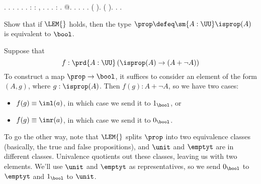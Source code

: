 \begin{coqdoccode}
 .  .  .\coqdoceol
\coqdocindent{1.00em}
 .  .\coqdoceol
\coqdocnoindent
{}.\coqdoceol
\coqdocemptyline
\coqdocnoindent
{}  : \coqdockw{\ensuremath{\forall}}   :  ,  \coqdocnotation{=} .\coqdoceol
\coqdocindent{1.00em}
 .\coqdoceol
\coqdocnoindent
{}.\coqdoceol
\coqdocemptyline
\coqdocnoindent
{}  : \coqdocnotation{(} \coqdocnotation{)} \coqdocnotation{\ensuremath{\eqvsym}} .\coqdoceol
\coqdocindent{1.00em}
 @.\coqdoceol
\coqdocindent{1.00em}
 .  .\coqdoceol
\coqdocindent{1.00em}
 .  .\coqdoceol
\coqdocindent{1.00em}
 (  ).\coqdoceol
\coqdocindent{1.00em}
 (  ).\coqdoceol
\coqdocnoindent
{}.\coqdoceol
\coqdocemptyline
\coqdocemptyline
\coqdocnoindent
{} .\coqdoceol
\coqdocemptyline
\end{coqdoccode}
Show that if $\LEM{}$ holds, then the type $\prop \defeq \sm{A:\UU}\isprop(A)$
is equivalent to $\bool$.


 \soln
Suppose that 
\[
  f : \prd{A:\UU}\left(\isprop(A) \to (A + \lnot A)\right)
\]
To construct a map $\prop \to \bool$, it suffices to consider an element of the
form $(A, g)$, where $g : \isprop(A)$.  Then $f(g) : A + \lnot A$, so we have
two cases:



\begin{itemize}
\item  $f(g) \equiv \inl(a)$, in which case we send it to $1_{\bool}$, or

\item  $f(g) \equiv \inr(a)$, in which case we send it to $0_{\bool}$.

\end{itemize}
To go the other way, note that $\LEM{}$ splits $\prop$ into two equivalence
classes (basically, the true and false propositions), and $\unit$ and $\emptyt$
are in different classes.  Univalence quotients out these classes, leaving us
with two elements.  We'll use $\unit$ and $\emptyt$ as representatives, so we
send $0_{\bool}$ to $\emptyt$ and $1_{\bool}$ to $\unit$.


